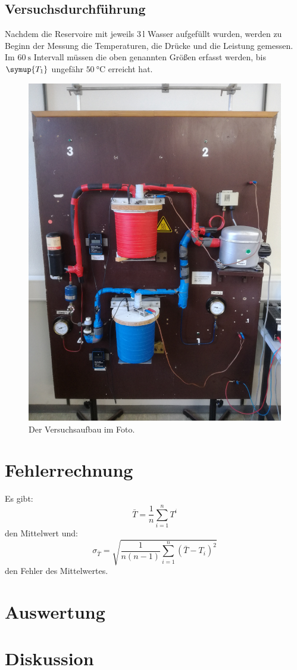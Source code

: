 \subsection{Versuchsdurchführung}
Nachdem die Reservoire mit jeweils 3\,$\si{\litre}$ Wasser aufgefüllt wurden,
werden zu Beginn der Messung  die Temperaturen, die Drücke und die Leistung gemessen.
Im $\SI{60}{\second}$ Intervall müssen die oben genannten Größen erfasst werden, bis
$\symup{T_1}$ ungefähr $\SI{50}{\celsius}$ erreicht hat.
\begin{figure}
  \centering
  \includegraphics[scale=0.07]{foto.jpg}
  \caption{Der Versuchsaufbau im Foto.}
  \label{fig:2}
\end{figure}
\section{Fehlerrechnung}
Es gibt:
\begin{equation}
  \bar{T} = \frac{1}{n} \sum_{i=1}^{n} T^{i}
  \label{eqn:1}
\end{equation}
den Mittelwert und:
\begin{equation}
  \sigma_{\bar{T}} = \sqrt{\frac{1}{n(n-1)} \sum_{i=1}^{n}(\bar{T}-T_i)^2}
  \label{eqn:2}
\end{equation}
den Fehler des Mittelwertes.
\section{Auswertung}
\section{Diskussion}
\newpage
\nocite{*}
\printbibliography
